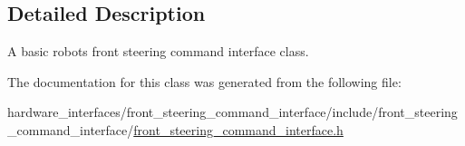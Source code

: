 \subsection{Detailed Description}
A basic robot\textquotesingle{}s front steering command interface class. 

The documentation for this class was generated from the following file\+:\begin{DoxyCompactItemize}
\item 
hardware\+\_\+interfaces/front\+\_\+steering\+\_\+command\+\_\+interface/include/front\+\_\+steering\+\_\+command\+\_\+interface/\hyperlink{front__steering__command__interface_8h}{front\+\_\+steering\+\_\+command\+\_\+interface.\+h}\end{DoxyCompactItemize}
